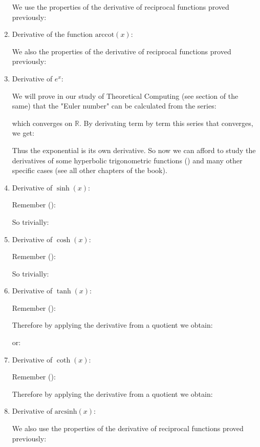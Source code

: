 \begin{enumerate}
		 	We use the properties of the derivative of reciprocal functions proved previously:
		 	
		 	\item Derivative of the function  $\text{arccot}(x)$:
		 	
		 	We also the properties of the derivative of reciprocal functions proved previously:
		 	
		 	\item Derivative of $e^x$:
		 	
		 	We will prove in our study of Theoretical Computing (see section of the same) that the "Euler number" can be calculated from the series:
		 	
		 	which converges on $\mathbb{R}$. By derivating term by term this series that converges, we get:
		 	
		 	Thus the exponential is its own derivative. So now we can afford to study the derivatives of some hyperbolic trigonometric functions () and many other specific cases (see all other chapters of the book).
		 	\item Derivative of $\sinh(x)$:
		 	
		 	Remember ():
		 	
		 	So trivially:
		 	
		 	
		 	\item Derivative of $\cosh(x)$:
		 	
		 	Remember ():
		 	
		 	So trivially:
		 	
		 	
		 	\item Derivative of $\tanh(x)$:
		 	
		 	Remember ():
		 	
		 	Therefore by applying the derivative from a quotient we obtain:
		 	
		 	or:
		 	
		 	\item Derivative of $\coth(x)$:
		 	
		 	Remember ():
		 	
		 	Therefore by applying the derivative from a quotient we obtain:
		 	
		 	
		 	\item Derivative of $\text{arcsinh}(x)$:
		 	
		 	We also use the properties of the derivative of reciprocal functions proved previously:
		 	

\end{enumerate}
